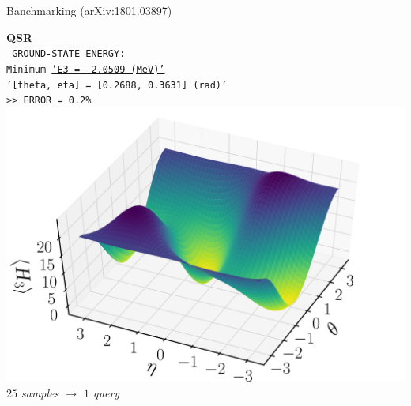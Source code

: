 \documentclass[9pt, handout, aspectratio=169]{beamer}	%
\begin{document}
\begin{frame}{Banchmarking (arXiv:1801.03897)}
\begin{multicols}{2}
		\begin{center}
			\textbf{QSR} \\
			\texttt{ \small
				GROUND-STATE ENERGY: \\
				Minimum \underline{'E3 = -2.0509 (MeV)'} \\
				'[theta, eta] = [0.2688, 0.3631] (rad)' \\
				>> ERROR = 0.2\% } \\
			\smallskip
			\includegraphics[width=.35\paperwidth]{Figures/deuteron-QSR} \\
			\smallskip
			\small{\emph{$25$ samples $\rightarrow$ $1$ query}}
		\end{center}

	\end{multicols}

\end{frame}

\end{document}
